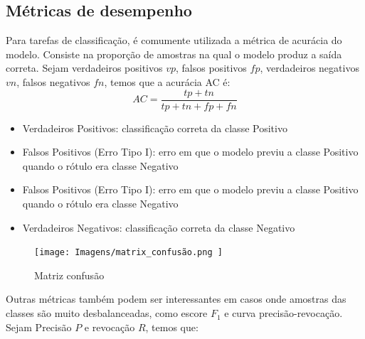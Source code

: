\subsection{Métricas de desempenho}\label{sec:cap2_metricas_desempenho}


Para tarefas de classificação, é comumente utilizada a métrica de acurácia do modelo. Consiste na proporção de amostras na qual o modelo produz a saída correta. Sejam verdadeiros positivos $vp$, falsos positivos $fp$, verdadeiros negativos $vn$, falsos negativos $fn$, temos que a acurácia AC é:
\begin{equation}AC = \frac{tp + tn}{tp + tn + fp + fn} \end{equation}

\begin{itemize}
    \item Verdadeiros Positivos: classificação correta da classe Positivo
    \item Falsos Positivos (Erro Tipo I): erro em que o modelo previu a classe Positivo quando o rótulo era classe Negativo
    \item Falsos Positivos (Erro Tipo I): erro em que o modelo previu a classe Positivo quando o rótulo era classe Negativo
    \item Verdadeiros Negativos: classificação correta da classe Negativo
\end{itemize}



\begin{figure}[!ht]
    \centering
    \texttt{[image: 
        Imagens/matrix\_confusão.png
    ]}
    \caption{Matriz confusão
}
    \label{fig:matriz_confusão}
\end{figure}

Outras métricas também podem ser interessantes em casos onde amostras das classes são muito desbalanceadas, como escore $F_1$ e curva precisão-revocação. Sejam Precisão $P$ e revocação $R$, temos que:



